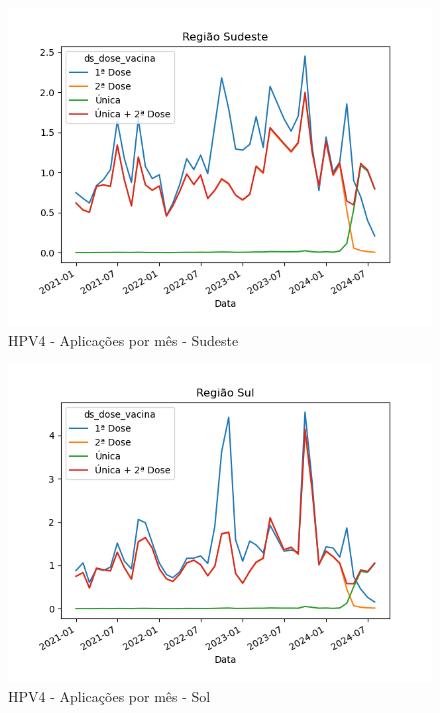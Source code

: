 \documentclass[12pt]{article}
\begin{document}
\begin{figure}[H]
    \centering
    \includegraphics[width=0.85\linewidth]{imagens/HPV4-Sudeste-Aplicacoes-mes}
    \caption{HPV4 - Aplicações por mês - Sudeste}
    \label{fig:HPV4-sudeste-aplicacoes-mes}
\end{figure}
\begin{figure}[H]
    \centering
    \includegraphics[width=0.85\linewidth]{imagens/HPV4-Sul-Aplicacoes-mes}
    \caption{HPV4 - Aplicações por mês - Sol}
    \label{fig:HPV4-sul-aplicacoes-mes}
\end{figure}
\end{document}
